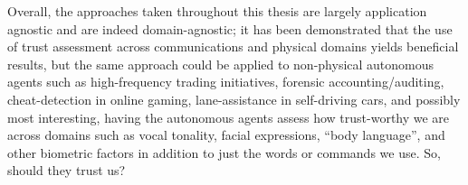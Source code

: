 Overall, the approaches taken throughout this thesis are largely application agnostic and are indeed domain-agnostic; it has been demonstrated that the use of trust assessment across communications and physical domains yields beneficial results, but the same approach could be applied to non-physical autonomous agents such as high-frequency trading initiatives, forensic accounting/auditing,  cheat-detection in online gaming, lane-assistance in self-driving cars, and possibly most interesting, having the autonomous agents assess how trust-worthy we are across domains such as vocal tonality, facial expressions, ``body language'', and other biometric factors in addition to just the words or commands we use.
So, should they trust us?